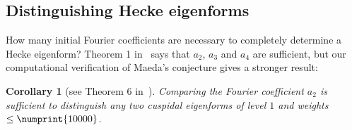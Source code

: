\documentclass[11pt]{article}
\theoremstyle{plain}
\newtheorem{corollary}[theorem]{Corollary}
\theoremstyle{definition}
\theoremstyle{remark}
\numberwithin{equation}{section}
\begin{document}
\subsection{Distinguishing Hecke eigenforms}

How many initial Fourier coefficients are necessary to completely determine a
Hecke eigenform?  Theorem 1 in~\cite{Ghitza} says that $a_2$, $a_3$ and $a_4$
are sufficient, but our computational verification of Maeda's conjecture gives
a stronger result:

\begin{corollary}[see Theorem 6 in~\cite{Ghitza}]
  Comparing the Fourier coefficient $a_2$ is sufficient to distinguish any two
  cuspidal eigenforms of level $1$ and weights $\leq\numprint{10000}$.
\end{corollary}



\printbibliography
\end{document}
